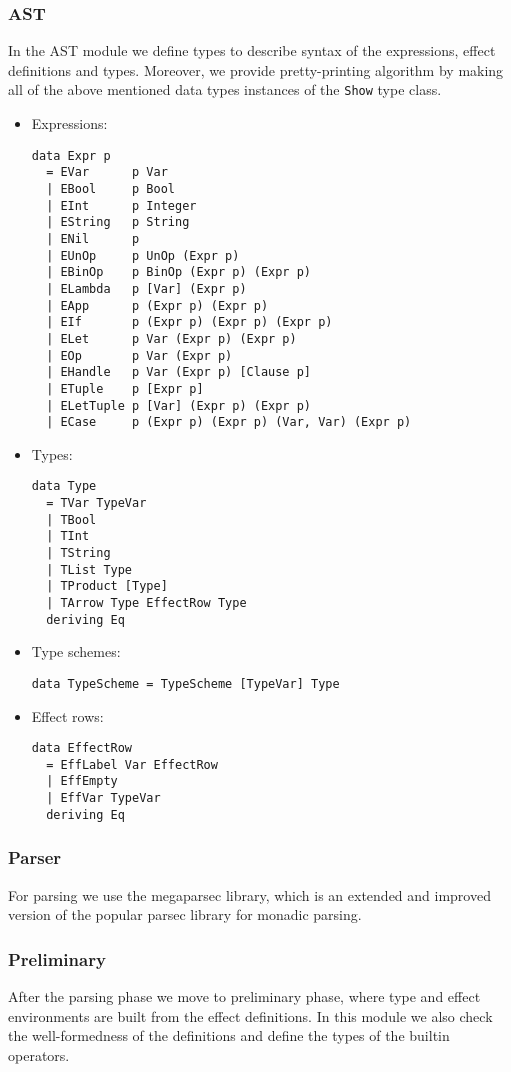 \documentclass[a4paper]{article}
\begin{document}
\subsubsection*{AST}
In the AST module we define types to describe syntax of the expressions,
effect definitions and types. Moreover, we provide pretty-printing algorithm
by making all of the above mentioned data types instances of the \verb+Show+ type class.
\begin{itemize}
\item Expressions:
\begin{verbatim}
data Expr p
  = EVar      p Var
  | EBool     p Bool
  | EInt      p Integer
  | EString   p String
  | ENil      p
  | EUnOp     p UnOp (Expr p)
  | EBinOp    p BinOp (Expr p) (Expr p)
  | ELambda   p [Var] (Expr p)
  | EApp      p (Expr p) (Expr p)
  | EIf       p (Expr p) (Expr p) (Expr p)
  | ELet      p Var (Expr p) (Expr p)
  | EOp       p Var (Expr p)
  | EHandle   p Var (Expr p) [Clause p]
  | ETuple    p [Expr p]
  | ELetTuple p [Var] (Expr p) (Expr p)
  | ECase     p (Expr p) (Expr p) (Var, Var) (Expr p)
\end{verbatim}
\item Types:
\begin{verbatim}
data Type
  = TVar TypeVar
  | TBool
  | TInt
  | TString
  | TList Type
  | TProduct [Type]
  | TArrow Type EffectRow Type
  deriving Eq
\end{verbatim}
\item Type schemes:
\begin{verbatim}
data TypeScheme = TypeScheme [TypeVar] Type
\end{verbatim}
\item Effect rows:
\begin{verbatim}
data EffectRow
  = EffLabel Var EffectRow
  | EffEmpty
  | EffVar TypeVar
  deriving Eq
\end{verbatim}
\end{itemize}
\subsubsection*{Parser}
For parsing we use the megaparsec library,
which is an extended and improved version of the popular parsec library for monadic parsing.

\subsubsection*{Preliminary}
After the parsing phase we move to preliminary phase, where type and effect environments
are built from the effect definitions. In this module we also check the well-formedness of the definitions
and define the types of the builtin operators.
\end{document}
